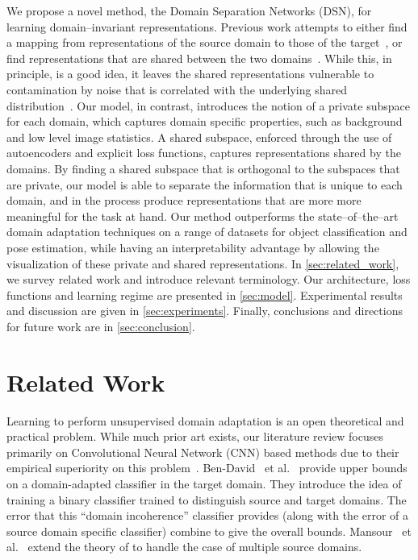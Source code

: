 \documentclass{article}
\newcommand{\secc}[1]{\autoref{sec:#1}}
\newcommand{\etal}{~et al.~}
\begin{document}
We propose a novel method, the Domain Separation Networks (DSN), for learning domain--invariant representations. Previous work attempts to either find a mapping from representations of the source domain to those of the target~\cite{sun2015return}, or find representations that are shared between the two domains~\cite{ganin2016domain,tzeng2015simultaneous,long2015learning}. While this, in principle, is a good idea, it leaves the shared representations vulnerable to contamination by noise that is correlated with the underlying shared distribution~\cite{salzmann2010factorized}. Our model, in contrast, introduces the notion of a private subspace for each domain, which captures domain specific properties, such as background and low level image statistics. A shared subspace, enforced through the use of autoencoders and explicit loss functions, captures representations shared by the domains. By finding a shared subspace that is orthogonal to the subspaces that are private, our model is able to separate the information that is unique to each domain, and in the process produce representations that are more more meaningful for the task at hand. 
Our method outperforms the state--of--the--art domain adaptation techniques on a range of datasets for object classification and pose estimation, while having an interpretability advantage by allowing the visualization of these private and shared representations. In \secc{related_work}, we survey related work and introduce relevant terminology. Our architecture, loss functions and learning regime are presented in \secc{model}. Experimental results and discussion are given in \secc{experiments}. Finally, conclusions and directions for future work are in \secc{conclusion}. \vspace{-4mm}
\section{Related Work}
\vspace{-4mm}
\label{sec:related_work}

Learning to perform unsupervised domain adaptation is an open theoretical and practical problem. While much prior art exists, our literature 
review focuses primarily on Convolutional Neural Network (CNN) based methods due
to their empirical superiority on this problem~\cite{ganin2016domain, long2015learning, sun2015return, tzeng2015ddc}. Ben-David \etal \cite{ben2010theory} provide upper bounds on a domain-adapted
classifier in the target domain. They introduce the idea of training a binary 
classifier trained to distinguish source and target domains. The error that this
``domain incoherence'' classifier provides (along with the error of a source domain specific classifier) combine to give the overall bounds. Mansour \etal \cite{mansour2009domain} extend the theory of \cite{ben2010theory} to handle the case of multiple source domains. 
\end{document}
